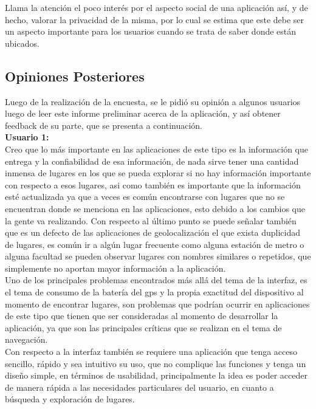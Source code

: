 \documentclass[10pt,letterpaper]{article}
\begin{document}
Llama la atención el poco interés por el aspecto social de una aplicación así, y de hecho, valorar la privacidad de la misma, por lo cual se estima que este debe ser un aspecto importante para los usuarios cuando se trata de saber donde están ubicados.\\

\subsection{Opiniones Posteriores}

Luego de la realización de la encuesta, se le pidió su opinión a algunos usuarios luego de leer este informe preliminar acerca de la aplicación, y así obtener feedback de su parte, que se presenta a continuación.\\

\textbf{Usuario 1:}\\

Creo que lo más importante en las aplicaciones de este tipo es la información que entrega y la confiabilidad de esa información, de nada sirve tener una cantidad inmensa de lugares en los que se pueda explorar si no hay información importante con respecto a esos lugares, asi como también es importante que la información esté actualizada ya que a veces es común encontrarse con lugares que no se encuentran donde se menciona en las aplicaciones, esto debido a los cambios que la gente va realizando. Con respecto al último punto se puede señalar también que es un defecto de las aplicaciones de geolocalización el que exista duplicidad de lugares, es común ir a algún lugar frecuente como alguna estación de metro o alguna facultad se pueden observar lugares con nombres similares o repetidos, que simplemente no aportan mayor información a la aplicación.\\

Uno de los principales problemas encontrados más allá del tema de la interfaz, es el tema de consumo de la batería del gps y la propia exactitud del dispositivo al momento de encontrar lugares, son problemas que podrían ocurrir en aplicaciones de este tipo que tienen que ser consideradas al momento de desarrollar la aplicación, ya que son las principales críticas que se realizan en el tema de navegación.\\

Con respecto a la interfaz también se requiere una aplicación que tenga acceso sencillo, rápido y sea intuitivo su uso, que no complique las funciones y tenga un diseño simple, en términos de usabilidad, principalmente la idea es poder acceder de manera rápida a las necesidades particulares del usuario, en cuanto a búsqueda y exploración de lugares.\\
\end{document}
